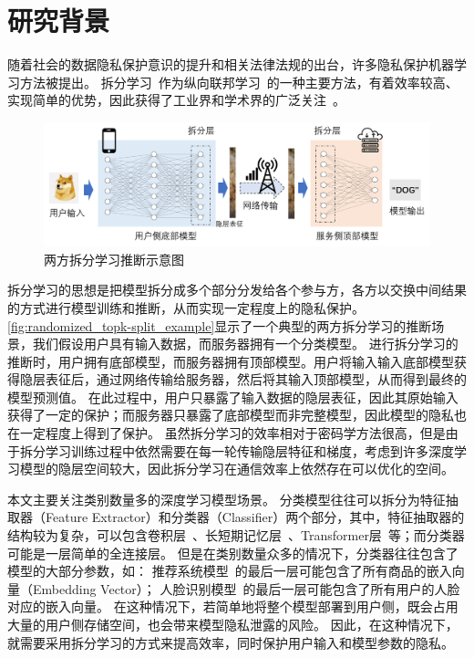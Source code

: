 \section{研究背景}
随着社会的数据隐私保护意识的提升和相关法律法规的出台，许多隐私保护机器学习方法被提出。
%
拆分学习~\cite{vepakomma2018split,poirot2019split}作为纵向联邦学习~\cite{liu2024vertical}的一种主要方法，有着效率较高、实现简单的优势，因此获得了工业界和学术界的广泛关注~\cite{palanisamy2021spliteasy,koda2020split_mmwave,fagbohungbe2022split_edge_image,roth2022split_unet}。
%


\begin{figure}[htbp]
    \centering
    \includegraphics[width=\linewidth]{Z_Resources/随机topk_两方拆分学习示意图.png}
    \caption{两方拆分学习推断示意图}
    \label{fig:randomized_topk-split_example}
\end{figure}

拆分学习的思想是把模型拆分成多个部分分发给各个参与方，各方以交换中间结果的方式进行模型训练和推断，从而实现一定程度上的隐私保护。
%
\autoref{fig:randomized_topk-split_example}显示了一个典型的两方拆分学习的推断场景，我们假设用户具有输入数据，而服务器拥有一个分类模型。
%
进行拆分学习的推断时，用户拥有底部模型，而服务器拥有顶部模型。用户将输入输入底部模型获得隐层表征后，通过网络传输给服务器，然后将其输入顶部模型，从而得到最终的模型预测值。
%
在此过程中，用户只暴露了输入数据的隐层表征，因此其原始输入获得了一定的保护；而服务器只暴露了底部模型而非完整模型，因此模型的隐私也在一定程度上得到了保护。
%
虽然拆分学习的效率相对于密码学方法很高，但是由于拆分学习训练过程中依然需要在每一轮传输隐层特征和梯度，考虑到许多深度学习模型的隐层空间较大，因此拆分学习在通信效率上依然存在可以优化的空间。
%



本文主要关注类别数量多的深度学习模型场景。
%
分类模型往往可以拆分为特征抽取器（Feature Extractor）和分类器（Classifier）两个部分，其中，特征抽取器的结构较为复杂，可以包含卷积层~\cite{lecun_1998_lenet,hekaiming2016resnet}、长短期记忆层~\cite{hochreiter_1997_lstm,chung_2014_gru}、Transformer层~\cite{vaswani_2017_attention}等；而分类器可能是一层简单的全连接层。
%
但是在类别数量众多的情况下，分类器往往包含了模型的大部分参数，如：
%
推荐系统模型~\cite{hidasi_2016_gru4rec,kang2018sasrec}的最后一层可能包含了所有商品的嵌入向量（Embedding Vector）；
%
人脸识别模型~\cite{parkhi2015deepface}的最后一层可能包含了所有用户的人脸对应的嵌入向量。
%
在这种情况下，若简单地将整个模型部署到用户侧，既会占用大量的用户侧存储空间，也会带来模型隐私泄露的风险。
%
因此，在这种情况下，就需要采用拆分学习的方式来提高效率，同时保护用户输入和模型参数的隐私。

